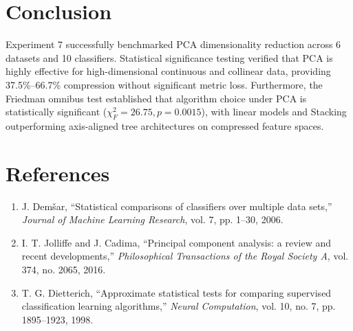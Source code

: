 \documentclass[12pt,a4paper]{article}
\begin{document}
\section{Conclusion}
Experiment 7 successfully benchmarked PCA dimensionality reduction across 6 datasets and 10 classifiers. Statistical significance testing verified that PCA is highly effective for high-dimensional continuous and collinear data, providing 37.5\%--66.7\% compression without significant metric loss. Furthermore, the Friedman omnibus test established that algorithm choice under PCA is statistically significant ($\chi_F^2 = 26.75, p = 0.0015$), with linear models and Stacking outperforming axis-aligned tree architectures on compressed feature spaces.

\section*{References}
\begin{enumerate}[noitemsep]
    \item J. Dem\v{s}ar, ``Statistical comparisons of classifiers over multiple data sets,'' \textit{Journal of Machine Learning Research}, vol. 7, pp. 1--30, 2006.
    \item I. T. Jolliffe and J. Cadima, ``Principal component analysis: a review and recent developments,'' \textit{Philosophical Transactions of the Royal Society A}, vol. 374, no. 2065, 2016.
    \item T. G. Dietterich, ``Approximate statistical tests for comparing supervised classification learning algorithms,'' \textit{Neural Computation}, vol. 10, no. 7, pp. 1895--1923, 1998.
\end{enumerate}
\end{document}
